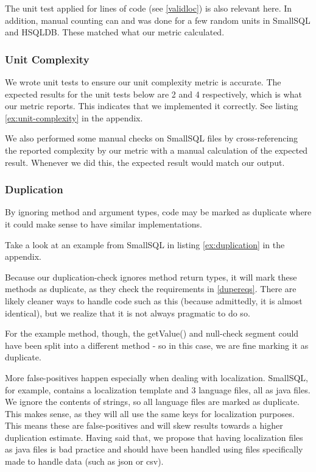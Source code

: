 \documentclass{article}
\begin{document}
The unit test applied for lines of code (see \ref{validloc}) is also relevant here. In addition, manual counting can and was done for a few random units in SmallSQL and HSQLDB. These matched what our metric calculated.

\subsubsection{Unit Complexity}
We wrote unit tests to ensure our unit complexity metric is accurate. The expected results for the unit tests below are 2 and 4 respectively, which is what our metric reports. This indicates that we implemented it correctly. See listing \ref{ex:unit-complexity} in the appendix.

We also performed some manual checks on SmallSQL files by cross-referencing the reported complexity by our metric with a manual calculation of the expected result. Whenever we did this, the expected result would match our output.

\subsubsection{Duplication}
By ignoring method and argument types, code may be marked as duplicate where it could make sense to have similar implementations.

Take a look at an example from SmallSQL in listing \ref{ex:duplication} in the appendix.

Because our duplication-check ignores method return types, it will mark these methods as duplicate, as they check the requirements in \ref{dupereqs}. 
There are likely cleaner ways to handle code such as this (because admittedly, it is almost identical), but we realize that it is not always pragmatic to do so. 

For the example method, though, the getValue() and null-check segment could have been split into a different method - so in this case, we are fine marking it as duplicate.

More false-positives happen especially when dealing with localization. SmallSQL, for example, contains a localization template and 3 language files, all as java files. We ignore the contents of strings, so all language files are marked as duplicate. This makes sense, as they will all use the same keys for localization purposes. This means these are false-positives and will skew results towards a higher duplication estimate. Having said that, we propose that having localization files as java files is bad practice and should have been handled using files specifically made to handle data (such as json or csv).
\end{document}
